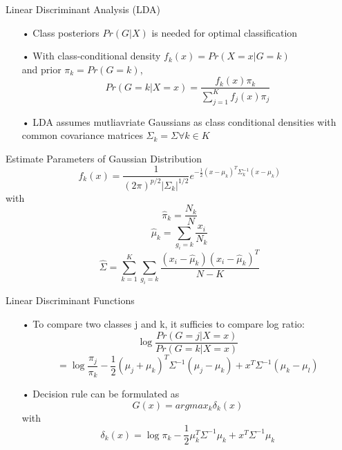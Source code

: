 \documentclass{beamer}
\begin{document}
\begin{frame}{Linear Discriminant Analysis (LDA)}
\begin{itemize}
\item[•] Class posteriors $Pr(G|X)$ is needed for optimal classification
\item[•] With class-conditional density $f_k(x)=Pr(X=x|G=k)$ \\ and prior $\pi_k = Pr(G=k)$, 
\pause
\begin{equation*}
Pr(G=k|X=x)=\frac{f_k(x)\pi_k}{\sum_{j=1}^{K}f_j(x)\pi_j}
\end{equation*}
\item[•] LDA assumes mutliavriate Gaussians as class conditional densities with common covariance matrices $\Sigma_k = \Sigma \forall k \in K$
\end{itemize}
\end{frame}

\begin{frame}{Estimate Parameters of Gaussian Distribution}
\begin{equation*}
f_k(x)=\frac{1}{(2\pi)^{p/2}|\Sigma_k|^{1/2}}e^{-\frac{1}{2}(x-\mu_k)^T\Sigma_k^{-1}(x-\mu_k)}
\end{equation*}
with
\begin{equation*}
\hat{\pi}_k = \frac{N_k}{N}
\end{equation*}
\begin{equation*}
\hat{\mu}_k=\sum_{g_i=k}\frac{x_i}{N_k}
\end{equation*}
\begin{equation*}
\hat{\Sigma}=\sum_{k=1}^K\sum_{g_i=k}\frac{(x_i-\hat{\mu}_k)(x_i-\hat{\mu}_k)^T}{N-K}
\end{equation*}
\end{frame}

\begin{frame}{Linear Discriminant Functions}
\begin{itemize}
\item[•] To compare two classes j and k, it sufficies to compare log ratio:
\begin{equation*}
\log\frac{Pr(G=j|X=x)}{Pr(G=k|X=x)} 
\end{equation*}
\begin{equation*}
= \log\frac{\pi_j}{\pi_k}-\frac{1}{2}(\mu_j+\mu_k)^T\Sigma^{-1}(\mu_j-\mu_k) + x^T \Sigma^{-1}(\mu_k-\mu_l)
\end{equation*}
\item[•] Decision rule can be formulated as 
\begin{equation*}
G(x) = argmax_k\delta_k(x)
\end{equation*}
with
\begin{equation*}
\delta_k(x) = \log\pi_k-\frac{1}{2}\mu_k^T\Sigma^{-1}\mu_k+x^T\Sigma^{-1}\mu_k
\end{equation*}
\end{itemize}
\end{frame}
\end{document}
